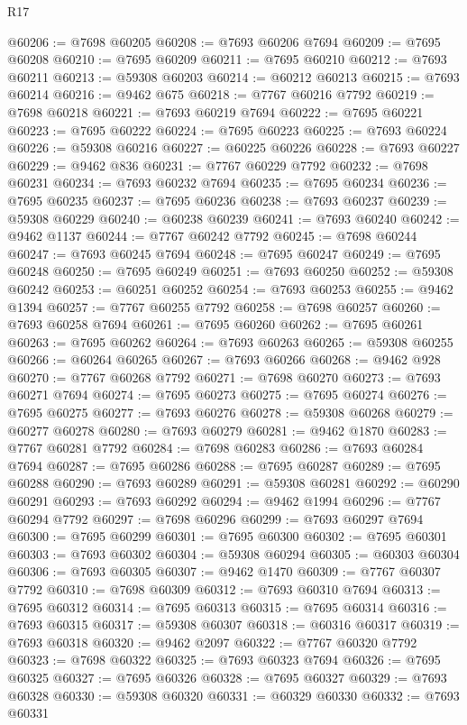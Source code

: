 \begin{lexlean}{R17}
\begin{coremodule}
@60206 := @7698 @60205
@60208 := @7693 @60206 @7694
@60209 := @7695 @60208
@60210 := @7695 @60209
@60211 := @7695 @60210
@60212 := @7693 @60211
@60213 := @59308 @60203
@60214 := @60212 @60213
@60215 := @7693 @60214
@60216 := @9462 @675
@60218 := @7767 @60216 @7792
@60219 := @7698 @60218
@60221 := @7693 @60219 @7694
@60222 := @7695 @60221
@60223 := @7695 @60222
@60224 := @7695 @60223
@60225 := @7693 @60224
@60226 := @59308 @60216
@60227 := @60225 @60226
@60228 := @7693 @60227
@60229 := @9462 @836
@60231 := @7767 @60229 @7792
@60232 := @7698 @60231
@60234 := @7693 @60232 @7694
@60235 := @7695 @60234
@60236 := @7695 @60235
@60237 := @7695 @60236
@60238 := @7693 @60237
@60239 := @59308 @60229
@60240 := @60238 @60239
@60241 := @7693 @60240
@60242 := @9462 @1137
@60244 := @7767 @60242 @7792
@60245 := @7698 @60244
@60247 := @7693 @60245 @7694
@60248 := @7695 @60247
@60249 := @7695 @60248
@60250 := @7695 @60249
@60251 := @7693 @60250
@60252 := @59308 @60242
@60253 := @60251 @60252
@60254 := @7693 @60253
@60255 := @9462 @1394
@60257 := @7767 @60255 @7792
@60258 := @7698 @60257
@60260 := @7693 @60258 @7694
@60261 := @7695 @60260
@60262 := @7695 @60261
@60263 := @7695 @60262
@60264 := @7693 @60263
@60265 := @59308 @60255
@60266 := @60264 @60265
@60267 := @7693 @60266
@60268 := @9462 @928
@60270 := @7767 @60268 @7792
@60271 := @7698 @60270
@60273 := @7693 @60271 @7694
@60274 := @7695 @60273
@60275 := @7695 @60274
@60276 := @7695 @60275
@60277 := @7693 @60276
@60278 := @59308 @60268
@60279 := @60277 @60278
@60280 := @7693 @60279
@60281 := @9462 @1870
@60283 := @7767 @60281 @7792
@60284 := @7698 @60283
@60286 := @7693 @60284 @7694
@60287 := @7695 @60286
@60288 := @7695 @60287
@60289 := @7695 @60288
@60290 := @7693 @60289
@60291 := @59308 @60281
@60292 := @60290 @60291
@60293 := @7693 @60292
@60294 := @9462 @1994
@60296 := @7767 @60294 @7792
@60297 := @7698 @60296
@60299 := @7693 @60297 @7694
@60300 := @7695 @60299
@60301 := @7695 @60300
@60302 := @7695 @60301
@60303 := @7693 @60302
@60304 := @59308 @60294
@60305 := @60303 @60304
@60306 := @7693 @60305
@60307 := @9462 @1470
@60309 := @7767 @60307 @7792
@60310 := @7698 @60309
@60312 := @7693 @60310 @7694
@60313 := @7695 @60312
@60314 := @7695 @60313
@60315 := @7695 @60314
@60316 := @7693 @60315
@60317 := @59308 @60307
@60318 := @60316 @60317
@60319 := @7693 @60318
@60320 := @9462 @2097
@60322 := @7767 @60320 @7792
@60323 := @7698 @60322
@60325 := @7693 @60323 @7694
@60326 := @7695 @60325
@60327 := @7695 @60326
@60328 := @7695 @60327
@60329 := @7693 @60328
@60330 := @59308 @60320
@60331 := @60329 @60330
@60332 := @7693 @60331

\end{coremodule}
\end{lexlean}

